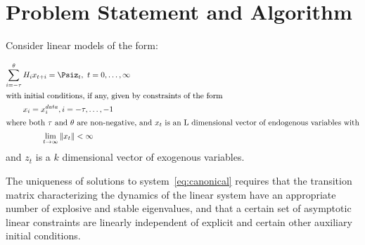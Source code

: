 \documentclass[12pt]{elsart}
\begin{document}
  \section{Problem Statement and Algorithm}
  

Consider linear models of the form:


\begin{gather}
\sum_{i=-\tau}^\theta{H_i x_{t+i}}= \Psi%
z_{t}, \,\, t = 0,\ldots,\infty\label{eq:canonical}\\ \intertext{with initial conditions, if any, given by constraints of the form}%
x_i  =  x^{data}_i,  i =  - \tau, \ldots, -1\label{eq:init}\\ \intertext{where both $\tau$ and $\theta$ are non-negative, and $x_t$ is an L dimensional vector 
of endogenous variables with}%
\lim_{ t \rightarrow\infty} \|x_t\|   < \infty\label{eq:limit} %
\end{gather}
{ and $z_t$ is a $k$ dimensional vector of exogenous variables.}


\label{sec:basic}

The uniqueness of solutions to 
system~\ref{eq:canonical} requires that
the transition matrix characterizing the dynamics of the 
linear system have an appropriate
number of explosive and stable eigenvalues\cite{blanchard80},
and that a certain set of  asymptotic linear constraints 
are linearly independent of explicit and certain other auxiliary initial 
conditions\cite{ANDER:AIM2}.
\end{document}
